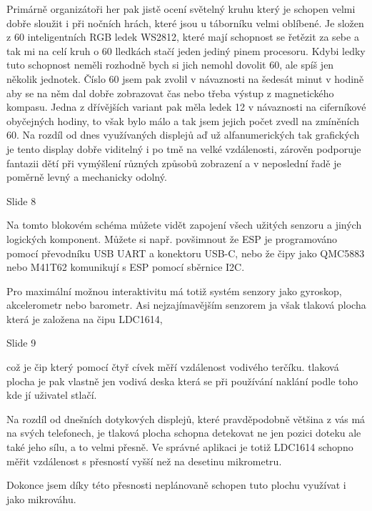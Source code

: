 Primárně organizátoři her pak jistě ocení světelný kruhu který je schopen velmi dobře sloužit i při nočních hrách,
které jsou u táborníku velmi oblíbené.
Je složen z 60 inteligentních RGB ledek WS2812, které mají schopnost se řetězit za sebe a tak mi na celí kruh o 60 lledkách
stačí jeden jediný pinem procesoru. Kdybi ledky tuto schopnost neměli rozhodně bych si jich nemohl dovolit 60,
ale spíš jen několik jednotek. Číslo 60 jsem pak zvolil v návaznosti na šedesát 
minut v hodině aby se na něm dal dobře zobrazovat čas nebo třeba výstup z magnetického kompasu. 
Jedna z dřívějších variant pak měla ledek 12 v návaznosti na ciferníkové obyčejných hodiny,
to však bylo málo a tak jsem jejich počet zvedl na zmíněních 60.
Na rozdíl od dnes využívaných displejů aď už alfanumerických tak grafických je tento display dobře viditelný i po tmě na velké vzdálenosti, 
zárověn podporuje fantazii dětí při vymýšlení různých způsobů zobrazení a v neposlední řadě je poměrně levný a mechanicky odolný. 


Slide 8

Na tomto blokovém schéma můžete vidět zapojení všech užitých senzoru a jiných logických komponent.
Můžete si např. povšimnout že ESP je programováno pomocí převodníku USB UART a konektoru USB-C,
nebo že čipy jako QMC5883 nebo M41T62 komunikují s ESP pomocí sběrnice I2C.

Pro maximální možnou interaktivitu má totiž systém senzory jako gyroskop, akcelerometr nebo barometr. 
Asi nejzajímavějším senzorem ja však tlaková plocha která je založena na čipu LDC1614, 


Slide 9

což je čip který 
pomocí čtyř cívek měří vzdálenost vodivého terčíku. tlaková plocha je pak vlastně 
jen vodivá deska která se při používání naklání podle toho kde jí uživatel stlačí. 

Na rozdíl od dnešních dotykových displejů,
které pravděpodobně většina z vás má na svých telefonech, je tlaková plocha schopna detekovat ne jen pozici doteku ale také jeho sílu,
a to velmi přesně. Ve správné aplikaci je totiž LDC1614 schopno měřit vzdálenost s přesností vyšší než na desetinu mikrometru.

Dokonce jsem díky této přesnosti neplánovaně schopen tuto plochu využívat i jako mikrováhu. %

